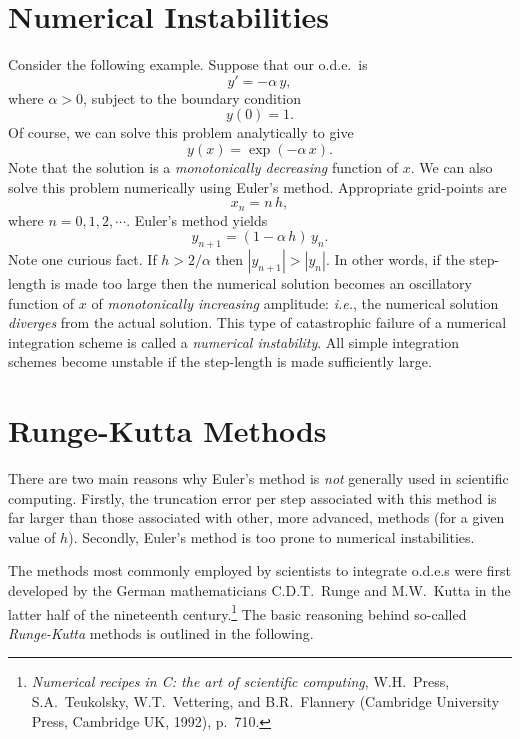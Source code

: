 \section{Numerical Instabilities}
Consider the following example. Suppose that our o.d.e.\ is
\begin{equation}
y' = - \alpha\,y,
\end{equation}
where $\alpha>0$, subject to the boundary condition
\begin{equation}
y(0) = 1.
\end{equation}
Of course, we can solve this problem analytically to give
\begin{equation}
y(x) = \exp(-\alpha\,x).
\end{equation}
Note that the solution is a {\em monotonically decreasing}\/ function of $x$. 
We can also solve this problem numerically using Euler's method. Appropriate
grid-points are
\begin{equation}
x_n = n\,h,
\end{equation}
where $n=0,1,2,\cdots$. Euler's method yields
\begin{equation}
y_{n+1} = (1-\alpha\,h)\,y_n.
\end{equation}
Note one curious fact. If $h>2/\alpha$ then $|y_{n+1}|> |y_n|$. 
In other words, if the step-length is made too large then the numerical
solution becomes an oscillatory  function of $x$ of 
{\em monotonically increasing}\/ amplitude: 
{\em i.e.}, the numerical solution {\em diverges}\/ from the actual
solution. This type of catastrophic failure of a numerical integration
scheme is called a {\em numerical instability}. All simple integration
schemes become unstable if the step-length is made sufficiently large.

\section{Runge-Kutta Methods}
There are two main reasons why Euler's method is {\em not}\/ generally used in scientific computing.
 Firstly, the truncation error per step associated with this method is far larger than
those associated with other, more advanced, methods (for a given value of $h$). 
Secondly, Euler's method  is too prone to numerical instabilities. 

The  methods  most commonly employed  by scientists to integrate
o.d.e.s were first developed by the German mathematicians C.D.T.~Runge and 
M.W.~Kutta in the latter half of the nineteenth century.\footnote{{\em Numerical recipes in C: the
art of scientific computing}, W.H.~Press, S.A.~Teukolsky, W.T.~Vettering, and
B.R.~Flannery (Cambridge University Press, Cambridge UK, 1992), p.~710.}
The basic reasoning behind so-called {\em Runge-Kutta}\/ methods is outlined in the
following.

